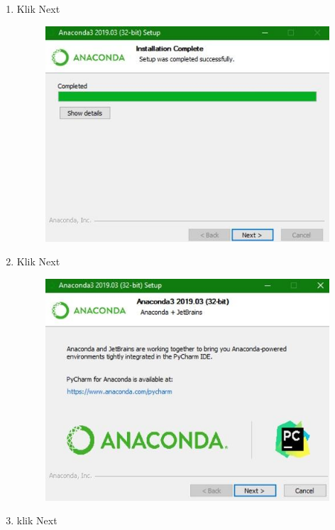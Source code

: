 \begin{enumerate}
\begin{figure}[!htbp]
        \label{gambar 1}
    \end{figure}
    \item Klik Next  
    \begin{figure}[!htbp]
        \centering
        \includegraphics[scale=0.6]{figure/Anaconda/6.jpeg}
        \label{gambar 1}
    \end{figure}
    \vspace{2cm}
    \item Klik Next
    \begin{figure}[!htbp]
        \centering
        \includegraphics[scale=0.6]{figure/Anaconda/7.jpeg}
        \label{gambar 1}
    \end{figure}
    \item klik Next

\end{enumerate}
